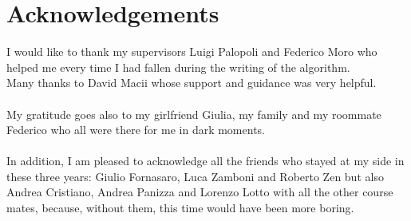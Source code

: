 \chapter*{Acknowledgements}
\thispagestyle{empty}

I would like to thank my supervisors Luigi Palopoli and Federico Moro who helped me every time I had fallen during the writing of the algorithm.
\\
Many thanks to David Macii whose support and guidance was very helpful.
\\ \\
My gratitude goes also to my girlfriend Giulia, my family and my roommate Federico who all were there for me in dark moments.
\\ \\
In addition, I am pleased to acknowledge all the friends who stayed at my side in these three years:
Giulio Fornasaro, Luca Zamboni and Roberto Zen but also Andrea Cristiano, Andrea Panizza and Lorenzo Lotto with all the other course mates, because, without them, this time would have been more boring.

